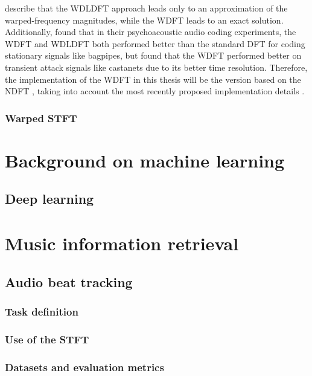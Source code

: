 \documentclass[letter,12pt,notitlepage]{article}
\begin{document}
\citet{warped1} describe that the WDLDFT approach leads only to an approximation of the warped-frequency magnitudes, while the WDFT leads to an exact solution. Additionally, \citet{warpedcomparison} found that in their psychoacoustic audio coding experiments, the WDFT and WDLDFT both performed better than the standard DFT for coding stationary signals like bagpipes, but found that the WDFT performed better on transient attack signals like castanets due to its better time resolution. Therefore, the implementation of the WDFT in this thesis will be the version based on the NDFT \cite{warped1}, taking into account the most recently proposed implementation details \cite{warped2}.

\subsubsection{Warped STFT}

\vfill
\clearpage

\section{Background on machine learning}
\label{sec:mldl}

\subsection{Deep learning}

\vfill
\clearpage

\section{Music information retrieval}
\label{sec:mirusecases}

\subsection{Audio beat tracking}

\subsubsection{Task definition}

\subsubsection{Use of the STFT}

\subsubsection{Datasets and evaluation metrics}
\end{document}
